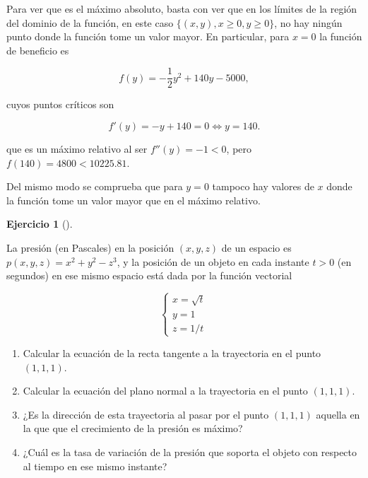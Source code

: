 \documentclass[
  spanish,
  a4paper,
]{scrreport}
\theoremstyle{definition}
\newtheorem{exercise}{Ejercicio}[chapter]
\theoremstyle{remark}
\begin{document}
\begin{tcolorbox}
Para ver que es el máximo absoluto, basta con ver que en los límites de
la región del dominio de la función, en este caso
\(\{(x,y), x\geq 0, y\geq 0\}\), no hay ningún punto donde la función
tome un valor mayor. En particular, para \(x=0\) la función de beneficio
es

\[
f(y) = -\frac{1}{2}y^2 + 140y - 5000,
\]

cuyos puntos críticos son

\[
f'(y) = -y + 140 = 0 \Leftrightarrow y = 140.
\]

que es un máximo relativo al ser \(f''(y) = -1<0\), pero
\(f(140) = 4800 < 10225.81\).

Del mismo modo se comprueba que para \(y=0\) tampoco hay valores de
\(x\) donde la función tome un valor mayor que en el máximo relativo.

\end{tcolorbox}

\begin{exercise}[]\protect\hypertarget{exr-2}{}\label{exr-2}

La presión (en Pascales) en la posición \((x,y,z)\) de un espacio es
\(p(x,y,z)= x^2+y^2-z^3\), y la posición de un objeto en cada instante
\(t>0\) (en segundos) en ese mismo espacio está dada por la función
vectorial

\[
\begin{cases}
x=\sqrt{t}\\
y=1\\
z=1/t
\end{cases}
\]

\begin{enumerate}
\def\labelenumi{\alph{enumi}.}
\item
  Calcular la ecuación de la recta tangente a la trayectoria en el punto
  \((1,1,1)\).
\item
  Calcular la ecuación del plano normal a la trayectoria en el punto
  \((1,1,1)\).
\item
  ¿Es la dirección de esta trayectoria al pasar por el punto \((1,1,1)\)
  aquella en la que que el crecimiento de la presión es máximo?
\item
  ¿Cuál es la tasa de variación de la presión que soporta el objeto con
  respecto al tiempo en ese mismo instante?
\end{enumerate}

\end{exercise}
\end{document}
